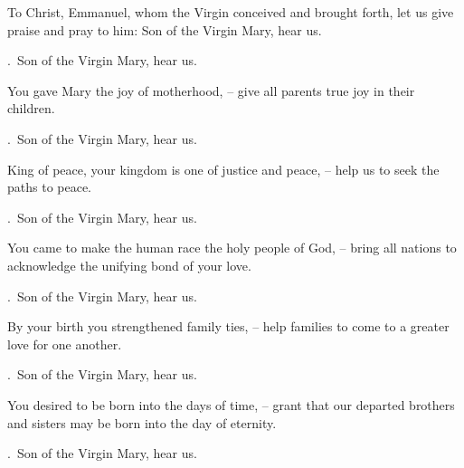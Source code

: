 \lettrine[loversize=0.15,lines=2]{T}{}o Christ, Emmanuel, whom the Virgin conceived and brought forth, let us give praise and pray to him: Son of the Virgin Mary, hear us.
\par \Rbar.~Son of the Virgin Mary, hear us.

You gave Mary the joy of motherhood,
– give all parents true joy in their children.
\par \Rbar.~Son of the Virgin Mary, hear us.

King of peace, your kingdom is one of justice and peace,
– help us to seek the paths to peace.
\par \Rbar.~Son of the Virgin Mary, hear us.

You came to make the human race the holy people of God,
– bring all nations to acknowledge the unifying bond of your love.
\par \Rbar.~Son of the Virgin Mary, hear us.

By your birth you strengthened family ties,
– help families to come to a greater love for one another.
\par \Rbar.~Son of the Virgin Mary, hear us.

You desired to be born into the days of time,
– grant that our departed brothers and sisters may be born into the day of eternity.
\par \Rbar.~Son of the Virgin Mary, hear us.
